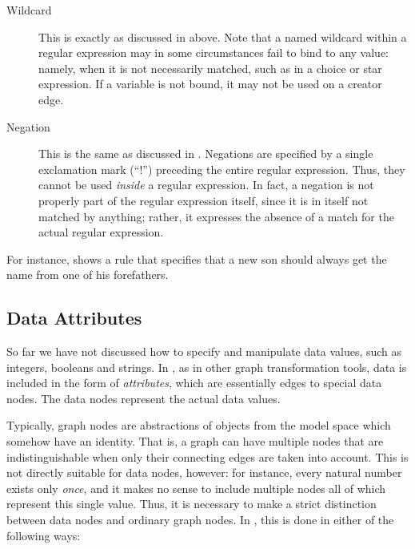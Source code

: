 \begin{description}
\item[Wildcard] This is exactly as discussed in  above.  Note
  that a named wildcard within a regular expression may in some circumstances
  fail to bind to any value: namely, when it is not necessarily matched, such
  as in a choice or star expression. If a variable is not bound, it may not be
  used on a creator edge.

\item[Negation] This is the same as discussed in . Negations
  are specified by a single exclamation mark (``\textsf{!}'') preceding the
  entire regular expression. Thus, they cannot be used \emph{inside} a
  regular expression. In fact, a negation is not properly part of the regular
  expression itself, since it is in itself not matched by anything; rather, it
  expresses the absence of a match for the actual regular expression.
\end{description}

For instance,  shows a rule that specifies that a new son should
always get the name from one of his forefathers.


\subsection{Data Attributes}

So far we have not discussed how to specify and manipulate data values, such as
integers, booleans and strings. In \Groove, as in other graph transformation
tools, data is included in the form of \emph{attributes}, which are essentially
edges to special data nodes. The data nodes represent the actual data values.

Typically, graph nodes are abstractions of objects from the model space which
somehow have an identity. That is, a graph can have multiple nodes that are
indistinguishable when only their connecting edges are taken into account. This
is not directly suitable for data nodes, however: for instance, every natural
number exists only \emph{once}, and it makes no sense to include multiple nodes
all of which represent this single value. Thus, it is necessary to make a
strict distinction between data nodes and ordinary graph nodes. In \Groove,
this is done in either of the following ways:

